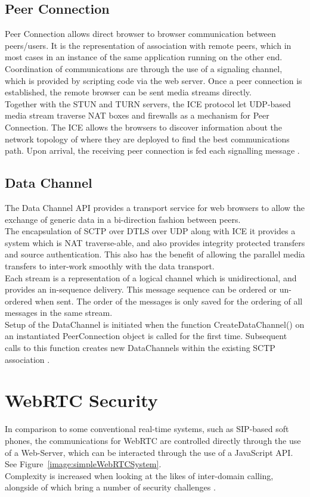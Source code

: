 \subsection{Peer Connection}
Peer Connection allows direct browser to browser communication between peers/users. It is the representation of association with remote peers, which in most cases in an instance of the same application running on the other end. Coordination of communications are through the use of a signaling channel, which is provided by scripting code via the web server. Once a peer connection is established, the remote browser can be sent media streams directly.
\\ Together with the STUN and TURN servers, the ICE protocol let UDP-based media stream traverse NAT boxes and firewalls as a mechanism for Peer Connection. The ICE allows the browsers to discover information about the network topology of where they are deployed to find the best communications path. Upon arrival, the receiving peer connection is fed each signalling message \cite{loreto2014real}.

\subsection{Data Channel}
The Data Channel API provides a transport service for web browsers to allow the exchange of generic data in a bi-direction fashion between peers.
\\ The encapsulation of SCTP over DTLS over UDP along with ICE it provides a system which is NAT traverse-able, and also provides integrity protected transfers and source authentication. This also has the benefit of allowing the parallel media transfers to inter-work smoothly with the data transport.
\\ Each stream is a representation of a logical channel which is unidirectional, and provides an in-sequence delivery. This message sequence can be ordered or un-ordered when sent. The order of the messages is only saved for the ordering of all messages in the same stream.
\\ Setup of the DataChannel is initiated when the function CreateDataChannel() on an instantiated PeerConnection object is called for the first time. Subsequent calls to this function creates new DataChannels within the existing SCTP association \cite{loreto2014real}.

\section{WebRTC Security}
In comparison to some conventional real-time systems, such as SIP-based soft phones, the communications for WebRTC are controlled directly through the use of a Web-Server, which can be interacted through the use of a JavaScript API. See Figure~\ref{image:simpleWebRTCSystem}.
\\Complexity is increased when looking at the likes of inter-domain calling, alongside of which bring a number of security challenges \cite{rescorla2013webrtc}.

